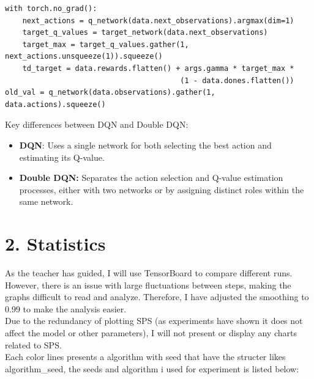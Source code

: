 \documentclass[english, a4paper,12pt]{article}
\begin{document}
\begin{verbatim}
with torch.no_grad():
    next_actions = q_network(data.next_observations).argmax(dim=1)
    target_q_values = target_network(data.next_observations)
    target_max = target_q_values.gather(1, next_actions.unsqueeze(1)).squeeze()
    td_target = data.rewards.flatten() + args.gamma * target_max * 
                                        (1 - data.dones.flatten())
old_val = q_network(data.observations).gather(1, data.actions).squeeze()
\end{verbatim}
\hspace*{5mm}Key differences between DQN and Double DQN:
\begin{itemize}
\vspace*{-2mm}
    \item \textbf{DQN}: Uses a single network for both selecting the best action and estimating its Q-value.
    \vspace*{-6mm}
    \item \textbf{Double DQN:} Separates the action selection and Q-value estimation processes, either with two networks or by assigning distinct roles within the same network.
\end{itemize}
\vspace*{-7mm}
\section*{2. Statistics}
\hspace*{5mm} As the teacher has guided, I will use TensorBoard to compare different runs. However, there is an issue with large fluctuations between steps, making the graphs difficult to read and analyze. Therefore, I have adjusted the smoothing to 0.99 to make the analysis easier.
\\
\hspace*{5mm}Due to the redundancy of plotting SPS (as experiments have shown it does not affect the model or other parameters), I will not present or display any charts related to SPS.
\\
\hspace*{5mm}  Each color lines presents a algorithm with seed that have the structer likes algorithm\_seed, the seeds and algorithm i used for experiment is listed below:
\end{document}
